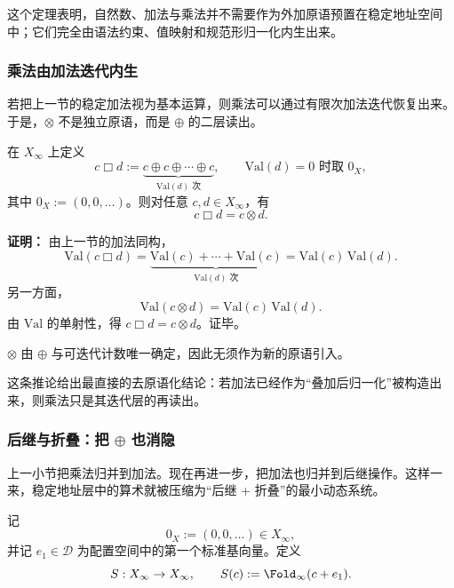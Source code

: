 这个定理表明，自然数、加法与乘法并不需要作为外加原语预置在稳定地址空间中；它们完全由语法约束、值映射和规范形归一化内生出来。

\subsubsection{乘法由加法迭代内生}\label{subsec:mul-as-iterated-add}
若把上一节的稳定加法视为基本运算，则乘法可以通过有限次加法迭代恢复出来。于是，\(\otimes\) 不是独立原语，而是 \(\oplus\) 的二层读出。

\begin{theorem}[乘法可由加法与迭代内生]\label{thm:mul-by-iterated-add}
在 \(X_\infty\) 上定义
\[
c\mathbin{\Box} d
:=
\underbrace{c\oplus c\oplus\cdots\oplus c}_{\mathrm{Val}(d)\text{ 次}},
\qquad
\mathrm{Val}(d)=0\text{ 时取 }0_X,
\]
其中 \(0_X:=(0,0,\dots)\)。则对任意 \(c,d\in X_\infty\)，有
\[
c\mathbin{\Box} d=c\otimes d.
\]
\end{theorem}

\textbf{证明：}
由上一节的加法同构，
\[
\mathrm{Val}(c\mathbin{\Box} d)
=
\underbrace{\mathrm{Val}(c)+\cdots+\mathrm{Val}(c)}_{\mathrm{Val}(d)\text{ 次}}
=\mathrm{Val}(c)\,\mathrm{Val}(d).
\]
另一方面，
\[
\mathrm{Val}(c\otimes d)=\mathrm{Val}(c)\,\mathrm{Val}(d).
\]
由 \(\mathrm{Val}\) 的单射性，得 \(c\mathbin{\Box} d=c\otimes d\)。证毕。

\begin{corollary}[“合并”的第一种严格版本]\label{cor:mul-no-new-primitive}
\(\otimes\) 由 \(\oplus\) 与可迭代计数唯一确定，因此无须作为新的原语引入。
\end{corollary}

这条推论给出最直接的去原语化结论：若加法已经作为“叠加后归一化”被构造出来，则乘法只是其迭代层的再读出。

\subsubsection{后继与折叠：把 \texorpdfstring{$\oplus$}{oplus} 也消隐}\label{subsec:succ-and-fold}
上一小节把乘法归并到加法。现在再进一步，把加法也归并到后继操作。这样一来，稳定地址层中的算术就被压缩为“后继 + 折叠”的最小动态系统。

\begin{definition}[后继与折叠]\label{def:successor-fold}
记
\[
0_X:=(0,0,\dots)\in X_\infty,
\]
并记 \(e_1\in\mathcal D\) 为配置空间中的第一个标准基向量。定义
\[
S:X_\infty\to X_\infty,\qquad
S(c):=\Fold_\infty(c+e_1).
\]
\end{definition}

